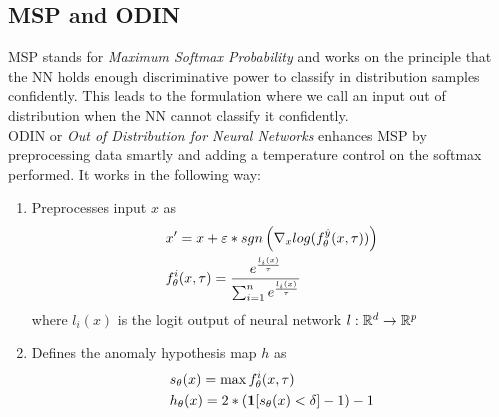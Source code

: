 \documentclass[11pt]{report}
\begin{document}
\subsection{MSP and ODIN}
MSP stands for \emph{Maximum Softmax Probability} and works on the principle that the NN holds enough discriminative power to classify in distribution samples confidently. This leads to the formulation where we call an input out of distribution when the NN cannot classify it confidently. 
\vspace{1mm}
\\ODIN or \emph{Out of Distribution for Neural Networks} enhances MSP by preprocessing data smartly and adding a temperature control on the softmax performed. It works in the following way:
\vspace{1mm}
\begin{enumerate}
    \item \label{mpp:gen_0} Preprocesses input \(x\) as
    \begin{align}
        \begin{aligned}
          & x'=x+\varepsilon * sgn \left( \nabla_x log(f_\theta^{\hat{y}}(x,\tau)) \right)\\
          & f_\theta^i(x,\tau) = \frac{e^{\frac{l_i(x)}{\tau}}}{\sum_{i=1}^n e^{\frac{l_i(x)}{\tau}}}
        \end{aligned} \nonumber
    \end{align}
where \(l_i(x)\) is the logit output of neural network \(l: \mathbb{R}^d \rightarrow \mathbb{R}^p \)


\item \label{mpp:gen_1} Defines the anomaly hypothesis map \(h\) as 
     \begin{align}
        \begin{aligned}
          & s_\theta(x)= \max f_\theta^i(x,\tau) \\
          & h_\theta(x)= 2 * \left( \mathbf{1}[s_\theta(x) < \delta] - 1 \right) -1
        \end{aligned} \nonumber
    \end{align}
\end{enumerate}
\end{document}
